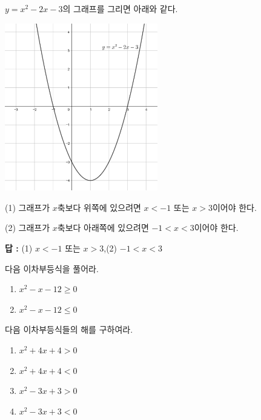 \documentclass{oblivoir}
\begin{document}
\begin{mdframed}[frametitle=풀이2]
\(y=x^2-2x-3\)의 그래프를 그리면 아래와 같다.
\begin{center}
\includegraphics[width=0.5\textwidth]{y=x^2-2x-3}
\end{center}

(1)
그래프가 \(x\)축보다 위쪽에 있으려면 \(x<-1\) 또는 \(x>3\)이어야 한다.

(2)
그래프가 \(x\)축보다 아래쪽에 있으려면 \(-1<x<3\)이어야 한다.
\end{mdframed}
{\par\raggedleft\textbf{답 : }
(1) \(x<-1\) 또는 \(x>3\),\quad (2) \(-1<x<3\)
\par}

\clearpage
%
\prob{}\label{ineq1}
다음 이차부등식을 풀어라.
\begin{enumerate}
\item
\(x^2-x-12\ge0\)
\item
\(x^2-x-12\le0\)
\end{enumerate}
\begin{mdframed}[frametitle=풀이1]
\vspace{0.3\textheight}
\end{mdframed}
\begin{mdframed}[frametitle=풀이2]
\vspace{0.3\textheight}
\end{mdframed}

\clearpage
%
\exam{}\label{D<0}
다음 이차부등식들의 해를 구하여라.
\begin{enumerate}
\item
\(x^2+4x+4>0\)
\item
\(x^2+4x+4<0\)
\item
\(x^2-3x+3>0\)
\item
\(x^2-3x+3<0\)
\end{enumerate}
\end{document}
